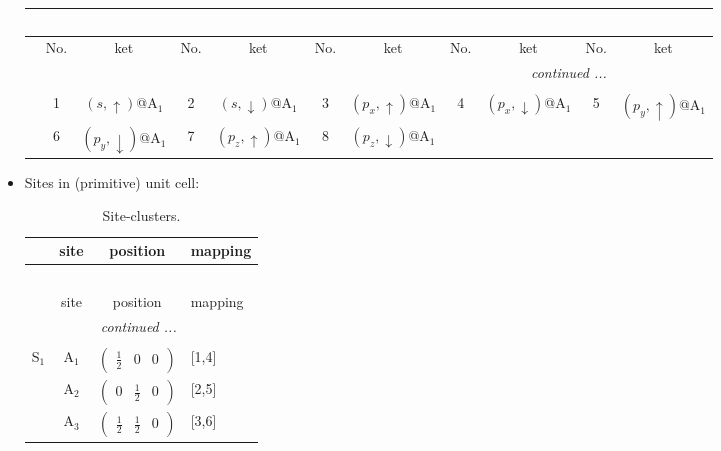 \documentclass[fleqn,10pt,landscape]{article}
\begin{document}
\begin{itemize}
\begin{center}
\begin{longtable}{c|cc|cc|cc|cc|cc}
\multicolumn{10}{l}{\tablename\ \thetable{}} \\
 \hline \hline
 & No. & ket & No. & ket & No. & ket & No. & ket & No. & ket \\ \hline \endhead

 \hline \hline
\multicolumn{10}{r}{\footnotesize\it continued ...} \\ \endfoot

 \hline \hline
\multicolumn{10}{r}{} \\ \endlastfoot

 & 1 & $(s,\uparrow)$@A$_{1}$ & 2 & $(s,\downarrow)$@A$_{1}$ & 3 & $(p_{x},\uparrow)$@A$_{1}$ & 4 & $(p_{x},\downarrow)$@A$_{1}$ & 5 & $(p_{y},\uparrow)$@A$_{1}$ \\
& 6 & $(p_{y},\downarrow)$@A$_{1}$ & 7 & $(p_{z},\uparrow)$@A$_{1}$ & 8 & $(p_{z},\downarrow)$@A$_{1}$ &  &  &  &  \\
\end{longtable}
\end{center}

\item Sites in (primitive) unit cell:
\begin{center}
\renewcommand{\arraystretch}{1.3}
\begin{longtable}{cc|c|l}
\caption{Site-clusters.}
 \\
 \hline \hline
 & site & position & mapping \\ \hline \endfirsthead

\multicolumn{3}{l}{\tablename\ \thetable{}} \\
 \hline \hline
 & site & position & mapping \\ \hline \endhead

 \hline \hline
\multicolumn{3}{r}{\footnotesize\it continued ...} \\ \endfoot

 \hline \hline
\multicolumn{3}{r}{} \\ \endlastfoot

S$_{1}$ & A$_1$ & $\begin{pmatrix} \frac{1}{2} & 0 & 0 \end{pmatrix}$ & [1,4] \\
& A$_2$ & $\begin{pmatrix} 0 & \frac{1}{2} & 0 \end{pmatrix}$ & [2,5] \\
& A$_3$ & $\begin{pmatrix} \frac{1}{2} & \frac{1}{2} & 0 \end{pmatrix}$ & [3,6] \\
\end{longtable}
\end{center}


\end{itemize}
\end{document}
